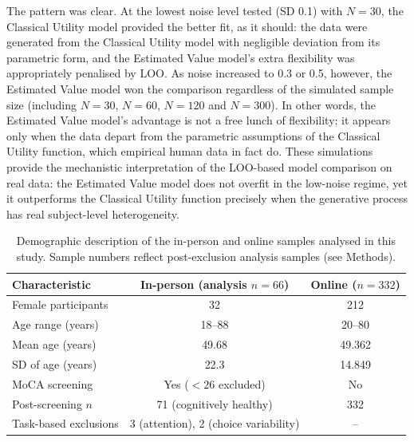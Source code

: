 \documentclass[11pt]{article}
\begin{document}
The pattern was clear. At the lowest noise level tested (SD 0.1) with $N = 30$, the Classical Utility model provided the better fit, as it should: the data were generated from the Classical Utility model with negligible deviation from its parametric form, and the Estimated Value model's extra flexibility was appropriately penalised by LOO. As noise increased to 0.3 or 0.5, however, the Estimated Value model won the comparison regardless of the simulated sample size (including $N=30$, $N=60$, $N=120$ and $N=300$). In other words, the Estimated Value model's advantage is not a free lunch of flexibility; it appears only when the data depart from the parametric assumptions of the Classical Utility function, which empirical human data in fact do. These simulations provide the mechanistic interpretation of the LOO-based model comparison on real data: the Estimated Value model does not overfit in the low-noise regime, yet it outperforms the Classical Utility function precisely when the generative process has real subject-level heterogeneity.

\begin{table}[htbp]
\centering
\caption{Demographic description of the in-person and online samples analysed in this study. Sample numbers reflect post-exclusion analysis samples (see Methods).}
\label{tab:demographics}
\begin{tabular}{lcc}
\toprule
Characteristic & In-person (analysis $n=66$) & Online ($n=332$) \\
\midrule
Female participants & 32 & 212 \\
Age range (years) & 18--88 & 20--80 \\
Mean age (years) & 49.68 & 49.362 \\
SD of age (years) & 22.3 & 14.849 \\
MoCA screening & Yes ($<26$ excluded) & No \\
Post-screening $n$ & 71 (cognitively healthy) & 332 \\
Task-based exclusions & 3 (attention), 2 (choice variability) & -- \\
\bottomrule
\end{tabular}
\end{table}
\end{document}
